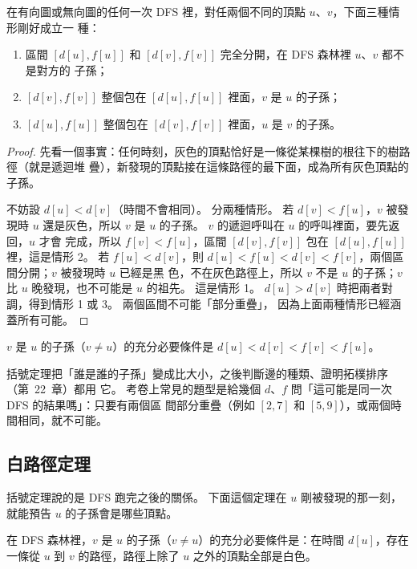 \begin{theorem}[括號定理]
\label{thm:gtr-paren}
在有向圖或無向圖的任何一次 DFS 裡，對任兩個不同的頂點 $u$、$v$，下面三種情形剛好成立一
種：
\begin{enumerate}
\item 區間 $[d[u], f[u]]$ 和 $[d[v], f[v]]$ 完全分開，在 DFS 森林裡 $u$、$v$ 都不是對方的
子孫；
\item $[d[v], f[v]]$ 整個包在 $[d[u], f[u]]$ 裡面，$v$ 是 $u$ 的子孫；
\item $[d[u], f[u]]$ 整個包在 $[d[v], f[v]]$ 裡面，$u$ 是 $v$ 的子孫。
\end{enumerate}
\end{theorem}

\begin{proof}
先看一個事實：任何時刻，灰色的頂點恰好是一條從某棵樹的根往下的樹路徑（就是遞迴堆
疊），新發現的頂點接在這條路徑的最下面，成為所有灰色頂點的子孫。

不妨設 $d[u] < d[v]$（時間不會相同）。 分兩種情形。 若 $d[v] < f[u]$，$v$ 被發現時 $u$
還是灰色，所以 $v$ 是 $u$ 的子孫。 $v$ 的遞迴呼叫在 $u$ 的呼叫裡面，要先返回，$u$ 才會
完成，所以 $f[v] < f[u]$，區間 $[d[v], f[v]]$ 包在 $[d[u], f[u]]$ 裡，這是情形 2。 若
$f[u] < d[v]$，則 $d[u] < f[u] < d[v] < f[v]$，兩個區間分開；$v$ 被發現時 $u$ 已經是黑
色，不在灰色路徑上，所以 $v$ 不是 $u$ 的子孫；$v$ 比 $u$ 晚發現，也不可能是 $u$ 的祖先。
這是情形 1。 $d[u] > d[v]$ 時把兩者對調，得到情形 1 或 3。 兩個區間不可能「部分重疊」，
因為上面兩種情形已經涵蓋所有可能。
\end{proof}

\begin{corollary}
\label{cor:gtr-nest}
$v$ 是 $u$ 的子孫（$v \ne u$）的充分必要條件是 $d[u] < d[v] < f[v] < f[u]$。
\end{corollary}

括號定理把「誰是誰的子孫」變成比大小，之後判斷邊的種類、證明拓樸排序（第~22~章）都用
它。 考卷上常見的題型是給幾個 $d$、$f$ 問「這可能是同一次 DFS 的結果嗎」：只要有兩個區
間部分重疊（例如 $[2, 7]$ 和 $[5, 9]$），或兩個時間相同，就不可能。

\subsection{白路徑定理}

括號定理說的是 DFS 跑完之後的關係。 下面這個定理在 $u$ 剛被發現的那一刻，就能預告
$u$ 的子孫會是哪些頂點。

\begin{theorem}[白路徑定理]
\label{thm:gtr-whitepath}
在 DFS 森林裡，$v$ 是 $u$ 的子孫（$v \ne u$）的充分必要條件是：在時間 $d[u]$，存在一條從
$u$ 到 $v$ 的路徑，路徑上除了 $u$ 之外的頂點全部是白色。
\end{theorem}

